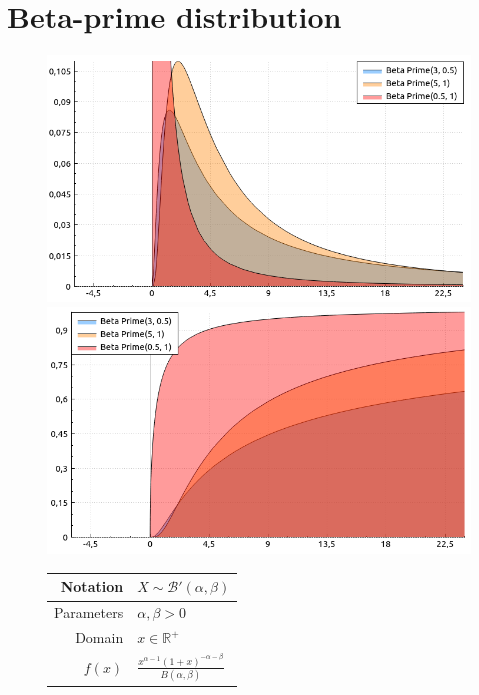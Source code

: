 \documentclass[a4paper,11pt]{article}
\theoremstyle{plain}
\theoremstyle{definition}
\newcommand{\MR}{\mathbb{R}}
\begin{document}
	\section{Beta-prime distribution}
		\begin{figure}[!htb]\centering
		\begin{minipage}{0.55\textwidth}
			\includegraphics[width=\linewidth, right]{beta_prime_pdf}
			\captionsetup{labelformat=empty}
			\includegraphics[width=\linewidth, right]{beta_prime_cdf}
			\captionsetup{labelformat=empty}
		\end{minipage}
		\begin{minipage}{0.4\textwidth}
			\begin{tabular}{| r | l |}
				\hline
				Notation & $X \sim \mathcal{B}'(\alpha, \beta)$ \\
				\hline
				Parameters & $\alpha, \beta > 0$ \\
				\hline
				Domain & $x \in \MR^+$  \\
				\hline
				$f(x)$ & $\frac{x^{\alpha - 1}(1 + x)^{-\alpha - \beta}}{B(\alpha, \beta)}$ \\

\end{tabular}
\end{minipage}
\end{figure}
\end{document}
